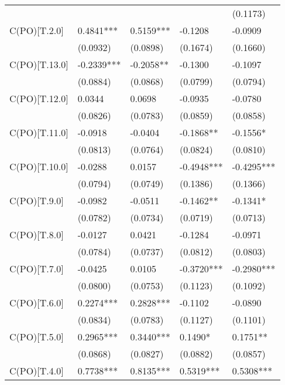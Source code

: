 \begin{table}
\begin{center}
\begin{tabular}{lllll}
                         &            &            &            & (0.1173)    \\
C(PO)[T.2.0]             & 0.4841***  & 0.5159***  & -0.1208    & -0.0909     \\
                         & (0.0932)   & (0.0898)   & (0.1674)   & (0.1660)    \\
C(PO)[T.13.0]            & -0.2339*** & -0.2058**  & -0.1300    & -0.1097     \\
                         & (0.0884)   & (0.0868)   & (0.0799)   & (0.0794)    \\
C(PO)[T.12.0]            & 0.0344     & 0.0698     & -0.0935    & -0.0780     \\
                         & (0.0826)   & (0.0783)   & (0.0859)   & (0.0858)    \\
C(PO)[T.11.0]            & -0.0918    & -0.0404    & -0.1868**  & -0.1556*    \\
                         & (0.0813)   & (0.0764)   & (0.0824)   & (0.0810)    \\
C(PO)[T.10.0]            & -0.0288    & 0.0157     & -0.4948*** & -0.4295***  \\
                         & (0.0794)   & (0.0749)   & (0.1386)   & (0.1366)    \\
C(PO)[T.9.0]             & -0.0982    & -0.0511    & -0.1462**  & -0.1341*    \\
                         & (0.0782)   & (0.0734)   & (0.0719)   & (0.0713)    \\
C(PO)[T.8.0]             & -0.0127    & 0.0421     & -0.1284    & -0.0971     \\
                         & (0.0784)   & (0.0737)   & (0.0812)   & (0.0803)    \\
C(PO)[T.7.0]             & -0.0425    & 0.0105     & -0.3720*** & -0.2980***  \\
                         & (0.0800)   & (0.0753)   & (0.1123)   & (0.1092)    \\
C(PO)[T.6.0]             & 0.2274***  & 0.2828***  & -0.1102    & -0.0890     \\
                         & (0.0834)   & (0.0783)   & (0.1127)   & (0.1101)    \\
C(PO)[T.5.0]             & 0.2965***  & 0.3440***  & 0.1490*    & 0.1751**    \\
                         & (0.0868)   & (0.0827)   & (0.0882)   & (0.0857)    \\
C(PO)[T.4.0]             & 0.7738***  & 0.8135***  & 0.5319***  & 0.5308***   \\

\end{tabular}
\end{center}
\end{table}
